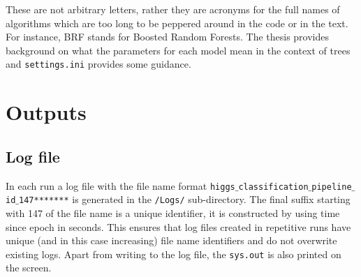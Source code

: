 \documentclass[a4paper,twoside]{article}
\begin{document}
\begin{table}[ht]
\caption{Necessary parameters for the tree algorithms}
\end{table}

These are not arbitrary letters, rather they are acronyms for the full names of algorithms which are too long to be peppered around in the code or in the text. For instance, BRF stands for Boosted Random Forests. The thesis provides background on what the parameters for each model mean in the context of trees and \texttt{settings.ini} provides some guidance.

\section{Outputs}

\subsection{Log file}
In each run a log file with the file name format \texttt{higgs$\_$classification$\_$pipeline$\_$id$\_$147*******} is generated in the \texttt{/Logs/} sub-directory. The final suffix starting with 147 of the file name is a unique identifier, it is constructed by using time since epoch in seconds. This ensures that log files created in repetitive runs have unique (and in this case increasing) file name identifiers and do not overwrite existing logs. Apart from writing to the log file, the \texttt{sys.out} is also printed on the screen.
\end{document}
